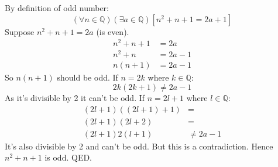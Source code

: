 \documentclass{article}
\begin{document}
By definition of odd number:
\newline
$$(\forall n \in \mathbb{Q})(\exists a \in \mathbb{Q})[n^{2}+n+1=2a+1]$$
\newline
Suppose $n^{2}+n+1=2a$ (is even).
\newline
\begin{align*}
n^{2}+n+1&=2a\\
n^{2}+n&=2a-1\\
n(n+1)&=2a-1
\end{align*}
\newline
So $n(n+1)$ should be odd.
\newline
If $n=2k$ where $k \in \mathbb{Q}$:
$$2k(2k+1)\not=2a-1$$
As it's divisible by 2 it can't be odd.
\newline
If $n=2l+1$ where $l \in \mathbb{Q}$:
\begin{align*}
(2l+1)((2l+1)+1)&=\\
(2l+1)(2l+2)&=\\
(2l+1)2(l+1)&\not=2a-1
\end{align*}
It's also divisible by 2 and can't be odd. But this is a contradiction.
\newline
Hence $n^{2}+n+1$ is odd.
\newline
QED.
\end{document}

